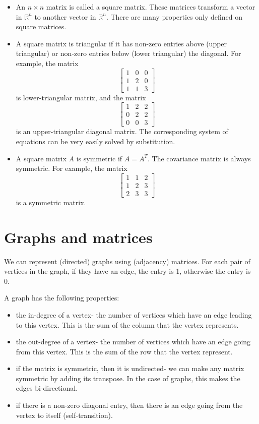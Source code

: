 \documentclass[a4paper, openany]{memoir}
\begin{document}
\begin{itemize}
        \item An $n \times n$ matrix is called a square matrix. These matrices transform a vector in $\mathbb{R}^n$ to another vector in $\mathbb{R}^n$. There are many properties only defined on square matrices.
    
        \item A square matrix is triangular if it has non-zero entries above (upper triangular) or non-zero entries below (lower triangular) the diagonal. For example, the matrix 
        \[\begin{bmatrix}
            1 & 0 & 0 \\
            1 & 2 & 0 \\
            1 & 1 & 3
        \end{bmatrix}\]
        is lower-triangular matrix, and the matrix 
        \[\begin{bmatrix}
            1 & 2 & 2 \\
            0 & 2 & 2 \\
            0 & 0 & 3
        \end{bmatrix}\]
        is an upper-triangular diagonal matrix. The corresponding system of equations can be very easily solved by substitution.
    
        \item A square matrix $A$ is symmetric if $A = A^T$. The covariance matrix is always symmetric. For example, the matrix 
        \[\begin{bmatrix}
            1 & 1 & 2 \\
            1 & 2 & 3 \\
            2 & 3 & 3
        \end{bmatrix}\]
        is a symmetric matrix.
    \end{itemize}
    \newpage

    \section{Graphs and matrices}
    We can represent (directed) graphs using (adjacency) matrices. For each pair of vertices in the graph, if they have an edge, the entry is 1, otherwise the entry is 0.

    A graph has the following properties:
    \begin{itemize}
        \item the in-degree of a vertex- the number of vertices which have an edge leading to this vertex. This is the sum of the column that the vertex represents.
        \item the out-degree of a vertex- the number of vertices which have an edge going from this vertex. This is the sum of the row that the vertex represent.
        \item if the matrix is symmetric, then it is undirected- we can make any matrix symmetric by adding its transpose. In the case of graphs, this makes the edges bi-directional.
        \item if there is a non-zero diagonal entry, then there is an edge going from the vertex to itself (self-transition).
    \end{itemize}
\end{document}
